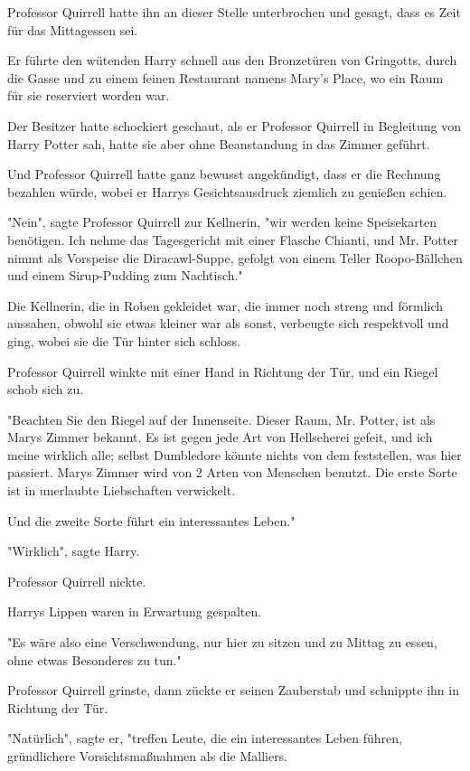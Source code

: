 {Professor Quirrell hatte ihn an dieser Stelle unterbrochen und gesagt, dass es Zeit für das Mittagessen sei.

Er führte den wütenden Harry schnell aus den Bronzetüren von Gringotts, durch die Gasse und zu einem feinen Restaurant namens Mary's Place, wo ein Raum für sie reserviert worden war.

Der Besitzer hatte schockiert geschaut, als er Professor Quirrell in Begleitung von Harry Potter sah, hatte sie aber ohne Beanstandung in das Zimmer geführt.

Und Professor Quirrell hatte ganz bewusst angekündigt, dass er die Rechnung bezahlen würde, wobei er Harrys Gesichtsausdruck ziemlich zu genießen schien.

"Nein", sagte Professor Quirrell zur Kellnerin, "wir werden keine Speisekarten benötigen. Ich nehme das Tagesgericht mit einer Flasche Chianti, und Mr. Potter nimmt als Vorspeise die Diracawl-Suppe, gefolgt von einem Teller Roopo-Bällchen und einem Sirup-Pudding zum Nachtisch."

Die Kellnerin, die in Roben gekleidet war, die immer noch streng und förmlich aussahen, obwohl sie etwas kleiner war als sonst, verbeugte sich respektvoll und ging, wobei sie die Tür hinter sich schloss.

Professor Quirrell winkte mit einer Hand in Richtung der Tür, und ein Riegel schob sich zu.

"Beachten Sie den Riegel auf der Innenseite. Dieser Raum, Mr. Potter, ist als Marys Zimmer bekannt. Es ist gegen jede Art von Hellseherei gefeit, und ich meine wirklich alle; selbst Dumbledore könnte nichts von dem feststellen, was hier passiert. Marys Zimmer wird von 2 Arten von Menschen benutzt. Die erste Sorte ist in unerlaubte Liebschaften verwickelt.

Und die zweite Sorte führt ein interessantes Leben."

"Wirklich", sagte Harry.

Professor Quirrell nickte.

Harrys Lippen waren in Erwartung gespalten.

"Es wäre also eine Verschwendung, nur hier zu sitzen und zu Mittag zu essen, ohne etwas Besonderes zu tun."

Professor Quirrell grinste, dann zückte er seinen Zauberstab und schnippte ihn in Richtung der Tür.

"Natürlich", sagte er, "treffen Leute, die ein interessantes Leben führen, gründlichere Vorsichtsmaßnahmen als die Malliers.

}
